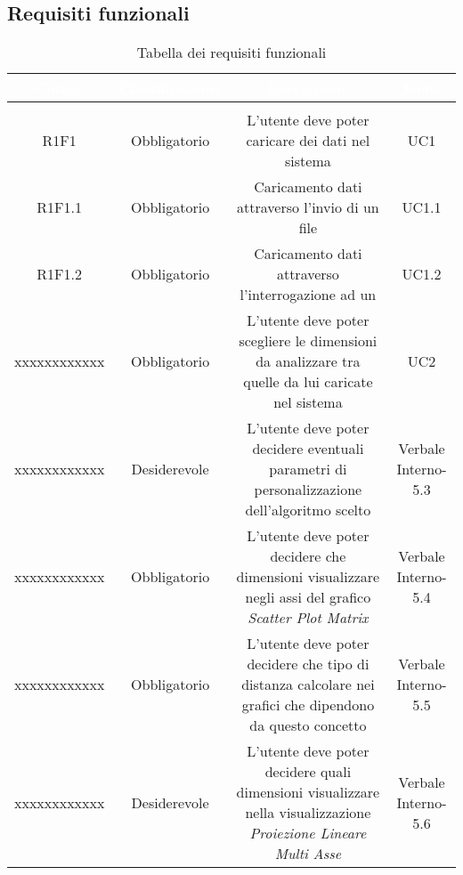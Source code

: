 \subsection{Requisiti funzionali}
\renewcommand{\arraystretch}{1.5}
\begin{center}
\begin{longtable}{C{\colA} C{\colB} C{\colC} C{\colA}}
		\textcolor{white}{\textbf{Codice}} & 
		\textcolor{white}{\textbf{Classificazione}} & 
		\textcolor{white}{\textbf{Descrizione}} & 
		\textcolor{white}{\textbf{Fonti}} \\
		\endfirsthead
	    \\
	    \endfoot
	    \caption{Tabella dei requisiti funzionali}
	    \endlastfoot

R1F1 & Obbligatorio & L'utente deve poter caricare dei dati nel sistema & UC1\\
R1F1.1 & Obbligatorio & Caricamento dati attraverso l'invio di un file  & UC1.1\\
R1F1.2 & Obbligatorio & Caricamento dati attraverso l'interrogazione ad un  & UC1.2\\

xxxxxxxxxxxx & Obbligatorio & L'utente deve poter scegliere le dimensioni da analizzare tra quelle da lui caricate nel sistema  & UC2\\

xxxxxxxxxxxx & Desiderevole & L'utente deve poter decidere eventuali parametri di personalizzazione dell'algoritmo scelto & Verbale Interno-5.3\\

xxxxxxxxxxxx & Obbligatorio & L'utente deve poter decidere che dimensioni visualizzare negli assi del grafico \textit{Scatter Plot Matrix} & Verbale Interno-5.4\\

xxxxxxxxxxxx & Obbligatorio & L'utente deve poter decidere che tipo di distanza calcolare nei grafici che dipendono da questo concetto & Verbale Interno-5.5\\

xxxxxxxxxxxx & Desiderevole & L'utente deve poter decidere quali dimensioni visualizzare nella visualizzazione \textit{Proiezione Lineare Multi Asse} & Verbale Interno-5.6\\


\end{longtable}
\end{center}
